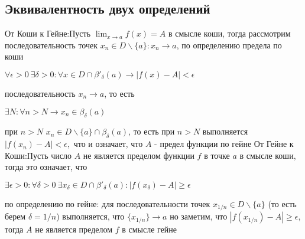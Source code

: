 \documentclass[12pt]{article}
\theoremstyle{definition}
\begin{document}
\subsection{Эквивалентность двух определений}
От Коши к Гейне:\newline Пусть $\lim_{x\to a}f(x) = A$ в смысле коши, тогда рассмотрим последовательность точек $x_n \in D \backslash \{a\}: x_n \to a$, по определению предела по коши 
\begin{center}
$\forall \epsilon > 0 \ \exists \delta > 0: \forall x \in D \cap \beta'_{\delta}(a) \to |f(x) - A | < \epsilon$
\end{center}
последовательность $x_n \to a$, то есть 
\begin{center}
$\exists N: \forall n > N \to x_n \in \beta_{\delta}(a)$    
\end{center}
при $n > N$ $x_n \in D \backslash \{a\} \cap \beta_{\delta}(a)$, то есть при $n > N$ выполняется $
|f(x_n) - A| < \epsilon, $ что и означает, что $A$ - предел функции по гейне\newline
От Гейне к Коши:\newline Пусть число $A$ не является пределом функции $f$ в точке $a$ в смысле коши, тогда это означает, что
\begin{center}
$\exists \epsilon > 0: \forall \delta > 0 \ \exists x_{\delta} \in D \cap \beta'_{\delta}(a): |f(x_{\delta}) - A| \geq \epsilon$
\end{center}
по определению  по гейне: для последовательности точек $ x_{1/n} \in D \backslash \{a\} $ (то есть берем $\delta = 1/n$) выполняется, что $\{x_{1/n}\} \to a$ но заметим, что $|f(x_{1/n}) - A| \geq \epsilon $, тогда $A$ не является пределом $f$ в смысле гейне
\end{document}
